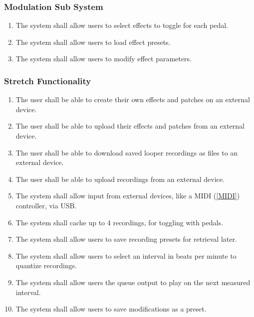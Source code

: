     \subsubsection{Modulation Sub System}
    \begin{enumerate}[label=\alph*.]
        \item The system shall allow users to select effects to toggle for each pedal.
        \item The system shall allow users to load effect presets.
        \item The system shall allow users to modify effect parameters.
    \end{enumerate}
    
    \subsubsection{Stretch Functionality}
    \begin{enumerate}[label=\alph*.]
        \item The user shall be able to create their own effects and patches on an external device.
        \item The user shall be able to upload their effects and patches from an external device.
        \item The user shall be able to download saved looper recordings as files to an external device.
        \item The user shall be able to upload recordings from an external device.
        \item The system shall allow input from external devices, like a MIDI (\ref{MIDI}) controller, via USB.
        \item The system shall cache up to 4 recordings, for toggling with pedals.
     \item The system shall allow users to save recording presets for retrieval later.
     \item The system shall allow users to select an interval in beats per minute to quantize recordings.
    \item The system shall allow users the queue output to play on the next measured interval.
            \item The system shall allow users to save modifications as a preset.
    \end{enumerate}

